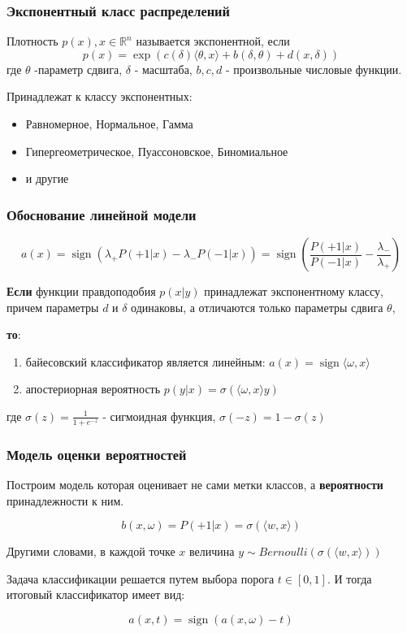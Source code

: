 \documentclass{beamer}
\DeclareMathOperator{\sign}{sign}
\begin{document}
	\begin{frame}
		\frametitle{Экспонентный класс распределений}
		Плотность $p(x), x \in \mathbb{R}^{n}$ называется экспонентной, если
		\[
		p(x) = \exp(c(\delta) \langle \theta, x \rangle + b(\delta, \theta) + d(x, \delta))
		\]
		где $\theta$ -параметр сдвига, $\delta$ - масштаба, $b, c, d$ - произвольные числовые функции.
		
		\vspace{15pt}
		
		Принадлежат к классу экспонентных:
		\begin{itemize}
			\item Равномерное, Нормальное, Гамма
			\item Гипергеометрическое, Пуассоновское, Биномиальное
			\item и другие
		\end{itemize}
	\end{frame}
	
	\begin{frame}
		\frametitle{Обоснование линейной модели}
		\[a(x) = \sign(\lambda_+ P(+1 | x) - \lambda_- P(-1 | x)) =
		\sign(\frac{P(+1 | x)}{P(-1 | x)} - \frac{\lambda_-}{\lambda_+})
		\]
		
		\textbf{Если} функции правдоподобия $p(x | y) $ принадлежат экспонентному классу, причем параметры $d$ и $\delta$ одинаковы, а отличаются только параметры сдвига $\theta$, 
		
		\textbf{то}:
		\begin{enumerate}
			\item байесовский классификатор является линейным: $a(x) = \sign \langle \omega, x \rangle$
			\item апостериорная вероятность $p(y | x) = \sigma(\langle \omega, x \rangle y)$
		\end{enumerate}
		
		где $\sigma(z) = \frac{1}{1 + e^{-z}}$ - сигмоидная функция, $\sigma(-z) = 1 - \sigma(z)$
	\end{frame}
	
	\begin{frame}
		\frametitle{Модель оценки вероятностей}
		Построим модель которая оценивает не сами метки классов, а \textbf{вероятности} принадлежности к ним.
		
		\[
		b(x, \omega) = P(+1 | x) = \sigma(\langle w, x \rangle)
		\]
		
		Другими словами, в каждой точке $x$ величина $y \sim Bernoulli(\sigma(\langle w, x \rangle))$
		
		\vspace{15pt}
		
		Задача классификации решается путем выбора порога $t \in [0, 1]$. И тогда итоговый классификатор имеет вид:
		
		\[
		a(x, t) = \sign (a(x, \omega) - t)
		\]
		
	\end{frame}
	
\end{document}
